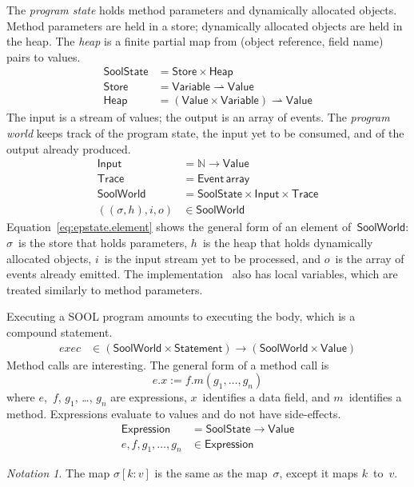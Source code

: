 \documentclass{sigplanconf} %
\newcommand{\N}{\ensuremath{\mathbb{N}}}
\newcommand{\pmap}{\rightharpoonup}
\newcommand{\set}[1]{\ensuremath{\mathsf{#1}}}
\theoremstyle{definition}
\theoremstyle{remark}
\newtheorem{notation}{Notation}
\begin{document}
The \emph{program state} holds method parameters and dynamically allocated objects.
Method parameters are held in a store;
dynamically allocated objects are held in the heap.
The \emph{heap} is a finite partial map from (object reference, field name) pairs to values.
\begin{align}
\set{SoolState}&=\set{Store}\times\set{Heap}\\
\set{Store}&=\set{Variable}\pmap\set{Value} \\
\set{Heap}&=(\set{Value}\times\set{Variable})\pmap\set{Value}
\end{align}
The input is a stream of values;
the output is an array of events.
The \emph{program world} keeps track of the program state, the input yet to be consumed, and of the output already produced.
\begin{align}
\set{Input}&=\N\to\set{Value} \label{eq:input}\\
\set{Trace}&=\set{Event}\,\mathsf{array} \\
\set{SoolWorld}&=\set{SoolState}\times\set{Input}\times\set{Trace} \\
((\sigma, h), i, o)&\in\set{SoolWorld} \label{eq:epstate.element}
\end{align}
Equation~\eqref{eq:epstate.element} shows the general form of an element of~\set{SoolWorld}: $\sigma$~is the store that holds parameters, $h$~is the heap that holds dynamically allocated objects, $i$~is the input stream yet to be processed, and $o$~is the array of events already emitted.
The implementation~\cite{web:topl.prototype} also has local variables, which are treated similarly to method parameters.

Executing a SOOL program amounts to executing the \Verb@main@ body, which is a compound statement.
\begin{align}
\mathit{exec}&\in(\set{SoolWorld}\times\set{Statement})\to(\set{SoolWorld}\times\set{Value})
\end{align}
Method calls are interesting.
The general form of a method call is \[ e.x := f.m(g_1,\ldots,g_n)\] where $e$,~$f$, $g_1$, \dots, $g_n$ are expressions, $x$~identifies a data field, and $m$~identifies a method.
Expressions evaluate to values and do not have side-effects.
\begin{align}
\set{Expression}&=\set{SoolState}\to\set{Value} \\
e,f,g_1,\ldots,g_n&\in\set{Expression}
\end{align}

\begin{notation}
The map $\sigma[k:v]$ is the same as the map~$\sigma$, except it maps $k$~to~$v$.
\end{notation}
\end{document}
